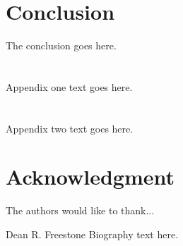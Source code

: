 \documentclass[onecolumn,draftcls]{IEEEtran}
\begin{document}

\section{Conclusion}
The conclusion goes here.

\appendices
\section{}
Appendix one text goes here.

\section{}
Appendix two text goes here.

\section*{Acknowledgment}
The authors would like to thank...

\ifCLASSOPTIONcaptionsoff
  \newpage
\fi








%

\begin{IEEEbiography}{Dean R. Freestone}
Biography text here.
\end{IEEEbiography}
\end{document}
